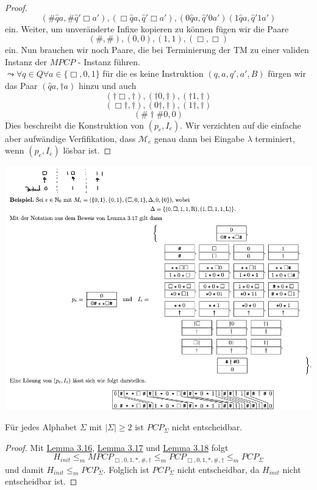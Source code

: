 \begin{proof}
      \[
        (\# \hat{q}a, \# \hat{q}'\Box a'), (\Box \hat{q} a, \hat{q}'\Box a'), (0\hat{q}a, \hat{q}'0a')(1\hat{q}a, \hat{q}'1a')
      \]
      ein. Weiter, um unveränderte Infixe kopieren zu können fügen wir die Paare 
      \[
        (\#, \#), (0, 0), (1,1), (\Box, \Box)
      \]
      ein. Nun brauchen wir noch Paare, die bei Terminierung der TM zu einer validen Instanz der \(MPCP\) - Instanz führen.\\ \(\leadsto \forall q \in Q \forall a \in \{\Box, 0, 1\}\) für die es keine Instruktion \((q, a, q', a', B)\) fürgen wir das Paar \((\hat{q}a, \dagger a)\) hinzu und auch 
      \[
        (\dagger \Box, \dagger), (\dagger 0, \dagger), (\dagger 1, \dagger)
      \] 
      \[
        (\Box \dagger, \dagger),(0 \dagger, \dagger),(1\dagger, \dagger)
      \] 
      \[
        (\# \dagger \# 0, 0)
      \]
      Dies beschreibt die Konstruktion von \((p_e, I_e)\). Wir verzichten auf die einfache aber aufwändige Verfifikation, dass \(\mathcal{M}_e\) genau dann bei Eingabe \(\lambda\) terminiert, wenn \((p_e, I_e)\) lösbar ist.
    \end{proof}

    \begin{center}  
      \includegraphics[scale=0.6]{Berechenbarkeit/beispiel.png}
    \end{center}

    Für jedes Alphabet \(\Sigma\) mit \(|\Sigma| \geq 2\) ist \(PCP_{\Sigma}\) nicht entscheidbar. 
    \begin{proof}
      Mit \hyperref[subsec:3.16]{Lemma 3.16}, \hyperref[subsec:3.17]{Lemma 3.17} und \hyperref[subsec:3.18]{Lemma 3.18} folgt 
      \[
        H_{init} \leq_m MPCP_{\Box, 0, 1, *, \#, \dagger} \leq_m PCP_{\Box, 0, 1, *, \#, \dagger} \leq_m PCP_{\Sigma}
      \] 
      und damit \(H_{init} \leq_m PCP_{\Sigma}\). Folglich ist \(PCP_{\Sigma}\) nicht entscheidbar, da \(H_{init}\) nicht entscheidbar ist.
    \end{proof}

